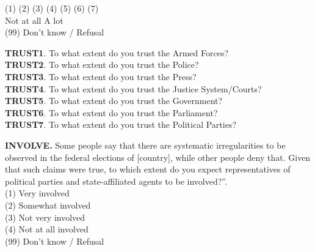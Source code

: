 \documentclass[11pt, ngerman,english,a4]{article}
\begin{document}
\noindent (1) \hspace{1cm} (2) \hspace{1cm} (3) \hspace{1cm} (4) \hspace{1cm} (5) \hspace{1cm} (6) \hspace{1cm} (7) \\
Not at all \hspace{8cm} A lot \\

\noindent (99) Don't know / Refusal \\

\vspace{0.5cm}

\noindent \textbf{TRUST1}. To what extent do you trust the Armed Forces? \\

\noindent \textbf{TRUST2}. To what extent do you trust the Police? \\

\noindent \textbf{TRUST3}. To what extent do you trust the Press? \\

\noindent \textbf{TRUST4}. To what extent do you trust the Justice System/Courts? \\

\noindent \textbf{TRUST5}. To what extent do you trust the Government? \\
 
\noindent \textbf{TRUST6}. To what extent do you trust the Parliament? \\
 
\noindent \textbf{TRUST7}. To what extent do you trust the Political Parties? \\

\vspace{0.5cm}

\noindent \textbf{INVOLVE.} Some people say that there are systematic irregularities to be observed in the federal elections of [country], while other people deny that. Given that such claims were true, to which extent do you expect representatives of political parties and state-affiliated agents to be involved?”. \\
(1) Very involved \\
(2) Somewhat involved \\
(3) Not very involved \\
(4) Not at all involved \\
(99) Don't know / Refusal \\
\end{document}
